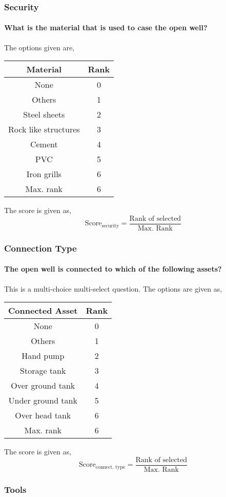 \documentclass[oneside,twocolumn]{article}
\newcommand{\tsub}[2]{\text{#1}_{\text{#2}}}
\newcommand{\dsub}[2]{\dfrac{\text{#1}}{\text{#2}}}
\newenvironment{ttable}
{
\begin{center}
\begin{tabular}{c|c}
\hline
}
{
\\ \hline
\end{tabular}
\end{center}
}
\begin{document}
\subsubsection{Security}
\paragraph{What is the material that is used to case the open well?}
The options given are,
\begin{ttable}
	Material & Rank \\ \hline
	None & 0 \\
	Others & 1 \\
	Steel sheets & 2 \\
	Rock like structures & 3 \\
	Cement & 4 \\
	PVC & 5 \\
	Iron grills & 6 \\ \hline
	Max. rank & 6 
\end{ttable}
The score is given as,
\[
	\tsub{Score}{security} = \dsub{Rank of selected}{Max. Rank}
\]

\subsubsection{Connection Type}
\paragraph{The open well is connected to which of the following assets?}
This is a multi-choice multi-select question. The options are given as,
\begin{ttable}
	Connected Asset & Rank \\ \hline
	None & 0 \\
	Others & 1 \\
	Hand pump & 2 \\
	Storage tank & 3 \\
	Over ground tank & 4 \\
	Under ground tank & 5 \\
	Over head tank & 6 \\ \hline
	Max. rank & 6
\end{ttable}
The score is given as,
\[
	\tsub{Score}{connect. type} = \dsub{Rank of selected}{Max. Rank}
\]

\subsubsection{Tools}
\end{document}
